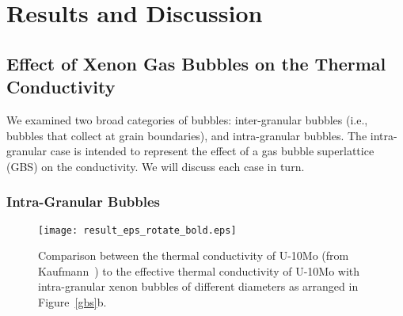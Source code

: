 \section{\label{sec:results}Results and Discussion}

\subsection{Effect of Xenon Gas Bubbles on the Thermal Conductivity} 
\label{subsec:xenonbubble}
We examined two broad categories of bubbles: inter-granular bubbles (i.e.,
bubbles that collect at grain boundaries), and intra-granular bubbles.
The intra-granular case is intended to represent the effect of a gas bubble
superlattice (GBS) on the conductivity. We will discuss each case in turn.

\subsubsection{Intra-Granular Bubbles}
\begin{figure}%
\centering
\texttt{[image: result\_eps\_rotate\_bold.eps]}
\caption[Comparision between the thermal conductivities]{Comparison between the thermal conductivity of U-10Mo (from Kaufmann~\cite{kaufmann1962nuclear}) to the effective thermal conductivity of U-10Mo with intra-granular xenon bubbles of different diameters as arranged in Figure~\ref{gbs}b.}
\label{fig_result_intra}
\end{figure}

